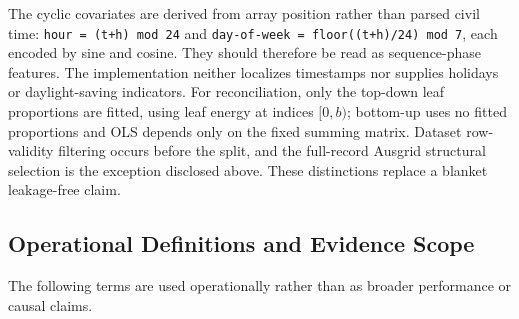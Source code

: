 \documentclass[electronics,article,submit,moreauthors]{Definitions/mdpi}
\begin{document}
The cyclic covariates are derived from array position rather than parsed civil time: \texttt{hour\ =\ (t+h)\ mod\ 24} and \texttt{day-of-week\ =\ floor((t+h)/24)\ mod\ 7}, each encoded by sine and cosine. They should therefore be read as sequence-phase features. The implementation neither localizes timestamps nor supplies holidays or daylight-saving indicators. For reconciliation, only the top-down leaf proportions are fitted, using leaf energy at indices \([0,b)\); bottom-up uses no fitted proportions and OLS depends only on the fixed summing matrix. Dataset row-validity filtering occurs before the split, and the full-record Ausgrid structural selection is the exception disclosed above. These distinctions replace a blanket leakage-free claim.

\subsection{Operational Definitions and Evidence Scope}\label{operational-definitions-and-evidence-scope}

The following terms are used operationally rather than as broader performance or causal claims.
\end{document}
